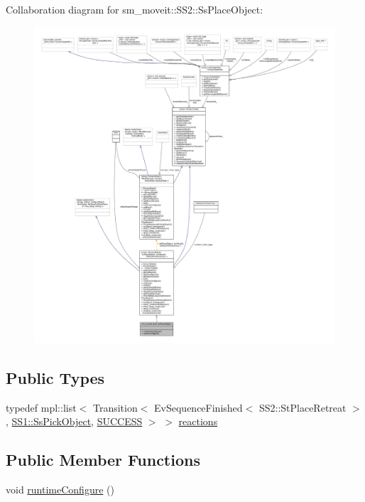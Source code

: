Collaboration diagram for sm\+\_\+moveit\+:\+:S\+S2\+:\+:Ss\+Place\+Object\+:
\nopagebreak
\begin{figure}[H]
\begin{center}
\leavevmode
\includegraphics[width=350pt]{structsm__moveit_1_1SS2_1_1SsPlaceObject__coll__graph}
\end{center}
\end{figure}
\subsection*{Public Types}
\begin{DoxyCompactItemize}
\item 
typedef mpl\+::list$<$ Transition$<$ Ev\+Sequence\+Finished$<$ S\+S2\+::\+St\+Place\+Retreat $>$, \hyperlink{structsm__moveit_1_1SS1_1_1SsPickObject}{S\+S1\+::\+Ss\+Pick\+Object}, \hyperlink{classSUCCESS}{S\+U\+C\+C\+E\+SS} $>$ $>$ \hyperlink{structsm__moveit_1_1SS2_1_1SsPlaceObject_acc874c137e9181f6575d964273e5a542}{reactions}
\end{DoxyCompactItemize}
\subsection*{Public Member Functions}
\begin{DoxyCompactItemize}
\item 
void \hyperlink{structsm__moveit_1_1SS2_1_1SsPlaceObject_a3bd09ee480b0444c5df6aee4b4f16ca2}{runtime\+Configure} ()
\end{DoxyCompactItemize}
